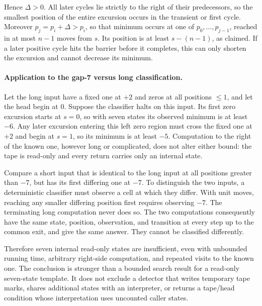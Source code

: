 Hence $\Delta>0$.  All later cycles lie strictly to the right of their
predecessors, so the smallest position of the entire excursion occurs in the
transient or first cycle.  Moreover $p_j=p_i+\Delta>p_i$, so that minimum
occurs at one of $p_0,\ldots,p_{j-1}$, reached in at most $n-1$ moves from $s$.
Its position is at least $s-(n-1)$, as claimed.  If a later positive cycle hits
the barrier before it completes, this can only shorten the excursion and
cannot decrease its minimum.

\paragraph{Application to the gap-7 versus long classification.}
Let the long input have a fixed one at $+2$ and zeros at all positions
$\le1$, and let the head begin at $0$.  Suppose the classifier halts on this
input.  Its first zero excursion starts at $s=0$, so with seven states its
observed minimum is at least $-6$.  Any later excursion entering this left
zero region must cross the fixed one at $+2$ and begin at $s=1$, so its minimum
is at least $-5$.  Computation to the right of the known one, however long or
complicated, does not alter either bound: the tape is read-only and every
return carries only an internal state.

Compare a short input that is identical to the long input at all positions
greater than $-7$, but has its first differing one at $-7$.  To distinguish
the two inputs, a deterministic classifier must observe a cell at which they
differ.  With unit moves, reaching any smaller differing position first
requires observing $-7$.  The terminating long computation never does so.
The two computations consequently have the same state, position, observation,
and transition at every step up to the common exit, and give the same answer.
They cannot be classified differently.

Therefore seven internal read-only states are insufficient, even with
unbounded running time, arbitrary right-side computation, and repeated visits
to the known one.  The conclusion is stronger than a bounded search result for
a read-only seven-state template.  It does not exclude a detector that writes
temporary tape marks, shares additional states with an interpreter, or returns
a tape/head condition whose interpretation uses uncounted caller states.
